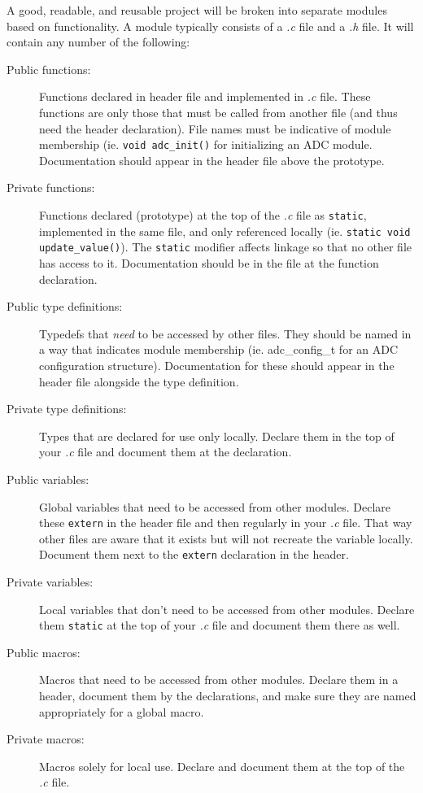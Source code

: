 \documentclass[10pt]{article}
\begin{document}
A good, readable, and reusable project will be broken into separate modules based on functionality. A module typically consists of a \textit{.c} file and a \textit{.h} file. It will contain any number of the following:
\begin{description}
\item[Public functions:] Functions declared in header file and implemented in \textit{.c} file. These functions are only those that must be called from another file (and thus need the header declaration). File names must be indicative of module membership (ie. \texttt{void adc\_init()} for initializing an ADC module. Documentation should appear in the header file above the prototype. 
\item[Private functions:] Functions declared (prototype) at the top of the \textit{.c} file as \texttt{static}, implemented in the same file, and only referenced locally (ie. \texttt{static void update\_value()}). The \texttt{static} modifier affects linkage so that no other file has access to it. Documentation should be in the file at the function declaration.
\item[Public type definitions:] Typedefs that \textit{need} to be accessed by other files. They should be named in a way that indicates module membership (ie. adc\_config\_t for an ADC configuration structure). Documentation for these should appear in the header file alongside the type definition. 
\item[Private type definitions:] Types that are declared for use only locally. Declare them in the top of your \textit{.c} file and document them at the declaration.
\item[Public variables:] Global variables that need to be accessed from other modules. Declare these \texttt{extern} in the header file and then regularly in your \textit{.c} file. That way other files are aware that it exists but will not recreate the variable locally. Document them next to the \texttt{extern} declaration in the header.
\item[Private variables:] Local variables that don't need to be accessed from other modules. Declare them \texttt{static} at the top of your \textit{.c} file and document them there as well.
\item[Public macros:] Macros that need to be accessed from other modules. Declare them in a header, document them by the declarations, and make sure they are named appropriately for a global macro.
\item[Private macros:] Macros solely for local use. Declare and document them at the top of the \textit{.c} file.
\end{description}
\end{document}
